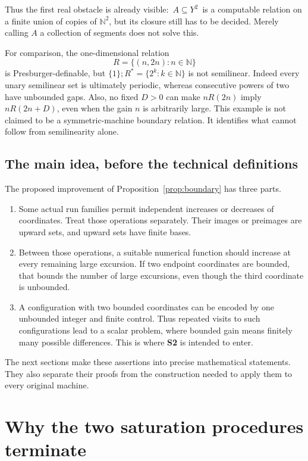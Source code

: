 \documentclass[11pt,a4paper]{article}
\theoremstyle{definition}
\theoremstyle{remark}
\newcommand{\N}{\mathbb N}
\begin{document}
Thus the first real obstacle is already visible:
\(\,A\subseteq Y^2\,\) is a computable relation on a finite union of
copies of \(\N^2\), but its closure still has to be decided.
Merely calling \(A\) a collection of segments does not solve this.

For comparison, the one-dimensional relation
\[
 R=\{(n,2n):n\in\N\}
\]
is Presburger-definable, but \(\{1\};R^*=\{2^k:k\in\N\}\) is not
semilinear. Indeed every unary semilinear set is ultimately periodic,
whereas consecutive powers of two have unbounded gaps.
Also, no fixed \(D>0\) can make \(nR(2n)\) imply \(nR(2n+D)\), even
when the gain \(n\) is arbitrarily large.
This example is not claimed to be a symmetric-machine boundary
relation. It identifies what cannot follow from semilinearity alone.

\subsection{The main idea, before the technical definitions}

The proposed improvement of Proposition~\ref{prop:boundary} has three
parts.
\begin{enumerate}[leftmargin=*]
\item Some actual run families permit independent increases or
decreases of coordinates. Treat those operations separately.
Their images or preimages are upward sets, and upward sets have
finite bases.
\item Between those operations, a suitable numerical function should
increase at every remaining large excursion. If two endpoint
coordinates are bounded, that bounds the number of large excursions,
even though the third coordinate is unbounded.
\item A configuration with two bounded coordinates can be encoded by
one unbounded integer and finite control. Thus repeated visits to
such configurations lead to a scalar problem, where bounded gain
means finitely many possible differences. This is where \textbf{S2}
is intended to enter.
\end{enumerate}
The next sections make these assertions into precise mathematical
statements. They also separate their proofs from the construction
needed to apply them to every original machine.



\section{Why the two saturation procedures terminate}
\label{sec:formal-saturation}
\end{document}
